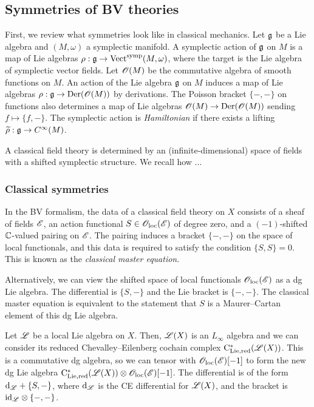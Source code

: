 \subsection{Symmetries of BV theories}

First, we review what symmetries look like in classical mechanics. 
Let $\mathfrak g$ be a Lie algebra and $(M, \omega)$ a symplectic manifold. 
A symplectic action of $\mathfrak g$ on $M$ is a map of Lie algebras $\rho : \mathfrak g \to {\rm Vect}^{\rm symp}(M, \omega)$, where the target is the Lie algebra of symplectic vector fields. 
Let $\mathscr O(M)$ be the commutative algebra of smooth functions on $M$.
An action of the Lie algebra $\mathfrak g$ on $M$ induces a map of Lie algebras $\rho : \mathfrak g \to {\rm Der}(\mathscr O(M))$ by derivations. 
The Poisson bracket $\{-,-\}$ on functions also determines a map of Lie algebras $\mathscr O(M) \to {\rm Der}(\mathscr O(M))$ sending $f \mapsto \{f,-\}$. 
The symplectic action is {\em Hamiltonian} if there exists a lifting $\widetilde{\rho} : \mathfrak g \to C^\infty(M)$.

A classical field theory is determined by an (infinite-dimensional) space of fields with a shifted symplectic structure. 
We recall how ...

\subsubsection{Classical symmetries}

In the BV formalism, the data of a classical field theory on $X$ consists of a sheaf of fields $\mathscr E$, an action functional $S \in {\mathscr O}_{\rm loc}(\mathscr E)$ of degree zero, and a $(-1)$-shifted $\mathbb C$-valued pairing on $\mathscr E$. 
The pairing induces a bracket $\{-,-\}$ on the space of local functionals, and this data is required to satisfy the condition $\{S,S\} = 0$.
This is known as the {\em classical master equation}. 

Alternatively, we can view the shifted space of local functionals ${\mathscr O}_{\rm loc}(\mathscr E)$ as a dg Lie algebra. 
The differential is $\{S,-\}$ and the Lie bracket is $\{-,-\}$. 
The classical master equation is equivalent to the statement that $S$ is a Maurer--Cartan element of this dg Lie algebra. 

Let $\mathscr L$ be a local Lie algebra on $X$. 
Then, $\mathscr L(X)$ is an $L_\infty$ algebra and we can consider its reduced Chevalley--Eilenberg cochain complex ${\rm C}_{\rm Lie, red}^*(\mathscr L(X))$.
This is a commutative dg algebra, so we can tensor with ${\mathscr O}_{\rm loc}(\mathscr E)[-1]$ to form the new dg Lie algebra ${\rm C}_{\rm Lie, red}^*(\mathscr L(X)) \otimes {\mathscr O}_{\rm loc}(\mathscr E)[-1]$. 
The differential is of the form ${\rm d}_{\mathscr L} + \{S,-\}$, where ${\rm d}_{\mathscr L}$ is the CE differential for $\mathscr L(X)$, and the bracket is ${\rm id}_\mathscr L \otimes \{-,-\}$.

